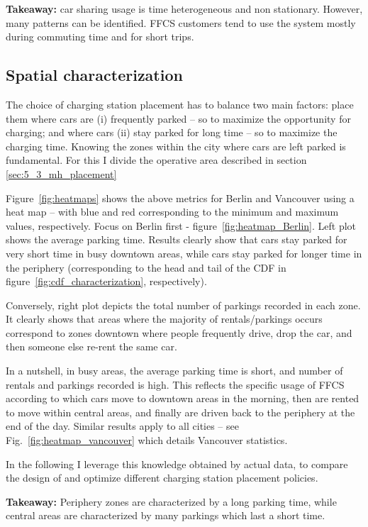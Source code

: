 \textbf{Takeaway:} car sharing usage is time heterogeneous and non stationary. However, many patterns can be identified. FFCS customers tend to use the system mostly during commuting time and for short trips.

\subsection{Spatial characterization}
\label{sec:dataspace}
The choice of charging station placement has to balance two main factors: place them where cars are (i) frequently parked -- so to maximize the opportunity for charging; and where cars (ii) stay parked for long time -- so to maximize the charging time. Knowing the zones within the city where cars are left parked is fundamental. For this I divide the operative area described in section \ref{sec:5_3_mh_placement}

Figure~\ref{fig:heatmaps} shows the above metrics for Berlin and Vancouver using a heat map -- with blue and red corresponding to the minimum and maximum values, respectively. Focus on Berlin first - figure~\ref{fig:heatmap_Berlin}. Left plot shows the average parking time. Results clearly show that cars stay parked for very short time in busy downtown areas, while cars stay parked for longer time in the periphery (corresponding to the head and tail of the CDF in figure~\ref{fig:cdf_characterization}, respectively).

Conversely, right plot depicts the total number of parkings recorded in each zone. It clearly shows that areas where the majority of rentals/parkings occurs correspond to zones downtown where people frequently drive, drop the car, and then someone else re-rent the same car. 

In a nutshell, in busy areas, the average parking time is short, and number of rentals and parkings recorded is high. This reflects the specific usage of FFCS according to which cars move to downtown areas in the morning, then are rented to move within central areas, and finally are driven back to the periphery at the end of the day.
Similar results apply to all cities -- see Fig.~\ref{fig:heatmap_vancouver} which details Vancouver statistics.

In the following I leverage this knowledge obtained by actual data, to compare the design of and optimize different charging station placement policies.


\textbf{Takeaway:} Periphery zones are characterized by a long parking time, while central areas are characterized by many parkings which last a short time.


